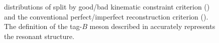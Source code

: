\begin{figure}[htbp!]
    \centering
    \caption{\label{fig:good_tag_definitions} \Mbc distributions of \BtoXsgamma split by good/bad kinematic constraint criterion ()
    and the conventional perfect/imperfect reconstruction criterion ().
    The definition of the tag-$B$ meson described in 
    accurately represents the resonant \Mbc structure.
    }
\end{figure}